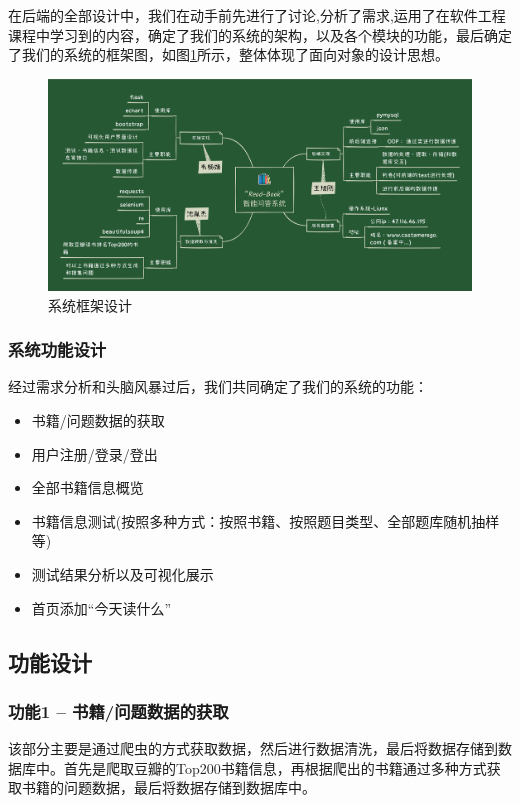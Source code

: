 \documentclass[twoside,11pt]{article}
\begin{document}
在后端的全部设计中，我们在动手前先进行了讨论,分析了需求\cite{Lance2018Creating},运用了在软件工程课程中学习到的内容\cite{roger2015software}，确定了我们的系统的架构，以及各个模块的功能，最后确定了我们的系统的框架图，如图\ref{fig:fig1}所示，整体体现了面向对象的设计思想。

\begin{figure}[H]
    \centering
    \includegraphics[width=1\columnwidth]{figures/系统框架设计.jpg}
    \caption{系统框架设计}
    \label{fig:fig1}
\end{figure}
\subsubsection{系统功能设计}

经过需求分析和头脑风暴过后，我们共同确定了我们的系统的功能：
\begin{itemize}
    \item 书籍/问题数据的获取
    \item 用户注册/登录/登出
    \item 全部书籍信息概览
    \item 书籍信息测试(按照多种方式：按照书籍、按照题目类型、全部题库随机抽样等)
    \item 测试结果分析以及可视化展示
    \item 首页添加``今天读什么''
\end{itemize}


\subsection{功能设计}

\subsubsection{功能1 -- 书籍/问题数据的获取}
该部分主要是通过爬虫的方式获取数据，然后进行数据清洗，最后将数据存储到数据库中。首先是爬取豆瓣的Top200书籍信息，再根据爬出的书籍通过多种方式获取书籍的问题数据，最后将数据存储到数据库中。
\end{document}
